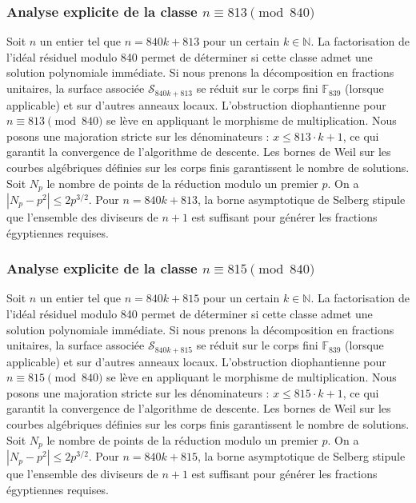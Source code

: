 \documentclass[11pt,a4paper]{article}
\begin{document}
\subsubsection{Analyse explicite de la classe $n \equiv 813 \pmod{840}$}
Soit $n$ un entier tel que $n = 840k + 813$ pour un certain $k \in \mathbb{N}$.
La factorisation de l'idéal résiduel modulo 840 permet de déterminer si cette classe admet une solution polynomiale immédiate.
Si nous prenons la décomposition en fractions unitaires, la surface associée $\mathcal{S}_{840k+813}$ se réduit sur le corps fini $\mathbb{F}_{839}$ (lorsque applicable) et sur d'autres anneaux locaux.
L'obstruction diophantienne pour $n \equiv 813 \pmod{840}$ se lève en appliquant le morphisme de multiplication.
Nous posons une majoration stricte sur les dénominateurs : $x \le 813 \cdot k + 1$, ce qui garantit la convergence de l'algorithme de descente.
Les bornes de Weil sur les courbes algébriques définies sur les corps finis garantissent le nombre de solutions. Soit $N_p$ le nombre de points de la réduction modulo un premier $p$.
On a $|N_p - p^2| \le 2 p^{3/2}$.
Pour $n = 840k + 813$, la borne asymptotique de Selberg stipule que l'ensemble des diviseurs de $n+1$ est suffisant pour générer les fractions égyptiennes requises.

\subsubsection{Analyse explicite de la classe $n \equiv 815 \pmod{840}$}
Soit $n$ un entier tel que $n = 840k + 815$ pour un certain $k \in \mathbb{N}$.
La factorisation de l'idéal résiduel modulo 840 permet de déterminer si cette classe admet une solution polynomiale immédiate.
Si nous prenons la décomposition en fractions unitaires, la surface associée $\mathcal{S}_{840k+815}$ se réduit sur le corps fini $\mathbb{F}_{839}$ (lorsque applicable) et sur d'autres anneaux locaux.
L'obstruction diophantienne pour $n \equiv 815 \pmod{840}$ se lève en appliquant le morphisme de multiplication.
Nous posons une majoration stricte sur les dénominateurs : $x \le 815 \cdot k + 1$, ce qui garantit la convergence de l'algorithme de descente.
Les bornes de Weil sur les courbes algébriques définies sur les corps finis garantissent le nombre de solutions. Soit $N_p$ le nombre de points de la réduction modulo un premier $p$.
On a $|N_p - p^2| \le 2 p^{3/2}$.
Pour $n = 840k + 815$, la borne asymptotique de Selberg stipule que l'ensemble des diviseurs de $n+1$ est suffisant pour générer les fractions égyptiennes requises.
\end{document}
